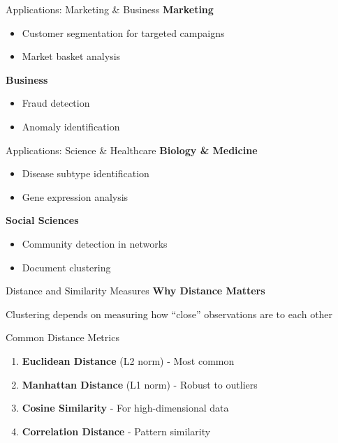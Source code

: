 \documentclass[aspectratio=169,ignorenonframetext]{beamer}
\begin{document}
\begin{frame}{Applications: Marketing \& Business}
\textbf{Marketing}

\begin{itemize}
\item
  Customer segmentation for targeted campaigns
\item
  Market basket analysis
\end{itemize}

\textbf{Business}

\begin{itemize}
\item
  Fraud detection
\item
  Anomaly identification
\end{itemize}
\end{frame}

\begin{frame}{Applications: Science \& Healthcare}
\textbf{Biology \& Medicine}

\begin{itemize}
\item
  Disease subtype identification
\item
  Gene expression analysis
\end{itemize}

\textbf{Social Sciences}

\begin{itemize}
\item
  Community detection in networks
\item
  Document clustering
\end{itemize}
\end{frame}

\begin{frame}{Distance and Similarity Measures}
\textbf{Why Distance Matters}

Clustering depends on measuring how ``close'' observations are to each
other
\end{frame}

\begin{frame}{Common Distance Metrics}
\begin{enumerate}
\item
  \textbf{Euclidean Distance} (L2 norm) - Most common
\item
  \textbf{Manhattan Distance} (L1 norm) - Robust to outliers
\item
  \textbf{Cosine Similarity} - For high-dimensional data
\item
  \textbf{Correlation Distance} - Pattern similarity
\end{enumerate}
\end{frame}
\end{document}
